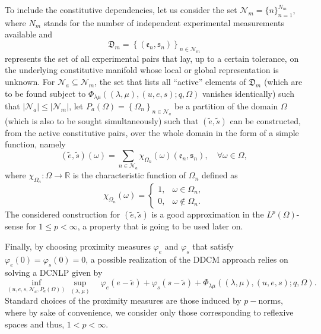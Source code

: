 To include the constitutive dependencies, let us consider the set $\mathcal{N}_m = \lbrace n\rbrace_{n=1}^{N_m}$, where $N_m$ stands for the number of independent experimental measurements available and
%
\begin{equation}
\mathfrak{D}_m =\left\lbrace\left(\mathfrak{e}_n,\mathfrak{s}_n\right)\right\rbrace_{n \in \mathcal{N}_m}
\end{equation}
%
represents the set of all experimental pairs that lay, up to a certain tolerance, on the underlying constitutive manifold whose local or global representation is unknown. For $\mathcal{N}_a \subseteq \mathcal{N}_m$, the set that lists all ``active'' elements of $\mathfrak{D}_m$ (which are to be found subject to $\Phi_{\lambda\mu}((\lambda, \mu),(u, e, s); q, \Omega)$ vanishes identically) such that $|\mathcal{N}_a| \leq |\mathcal{N}_m|$, let $ P_a(\Omega) = \left\lbrace \Omega_n \right\rbrace_{n\in \mathcal{N}_a}$ be a partition of the domain $\Omega$ (which is also to be sought simultaneously) such that $(\tilde{e},\tilde{s})$ can be constructed, from the active constitutive pairs, over the whole domain in the form of a simple function, namely
\begin{equation}
(\tilde{e},\tilde{s})(\omega) = \sum_{n \in \mathcal{N}_a}\chi_{\Omega_n}(\omega)(\mathfrak{e}_n,\mathfrak{s}_n), \quad\forall\omega\in\Omega,
\label{eq:approxsimple}
\end{equation}
where $\chi_{\Omega_n}:\Omega \to \mathbb{R}$ is the characteristic function of $\Omega_n$ defined as
\begin{equation}
\chi_{\Omega_n}(\omega) = 
\left\lbrace
\begin{array}{rl}
1, & \omega \in \Omega_n,\\
0, & \omega \notin \Omega_n .
\end{array}
\right.
\end{equation}
%
The considered construction for $(\tilde{e},\tilde{s})$ is a good approximation in the $L^p(\Omega)$-sense for $1 \leq p < \infty$, a property that is going to be used later on.

Finally, by choosing proximity measures $\varphi_e$ and $\varphi_s$ that satisfy $\varphi_e(0) = \varphi_s(0) = 0$, a possible realization of the DDCM approach relies on solving a DCNLP given by
%
\begin{equation}
\inf_{(u,e,s,\mathcal{N}_a,P_a(\Omega))} \sup_{(\lambda, \mu)} \quad \varphi_e(e-\tilde{e})+\varphi_s(s-\tilde{s})+\Phi_{\lambda\mu}((\lambda, \mu), (u, e, s); q, \Omega).
\label{eq:dcnlp}
\end{equation}
%
Standard choices of the proximity measures are those induced by $p-$norms, where by sake of convenience, we consider only those corresponding to reflexive spaces and thus, $1 < p < \infty$.

